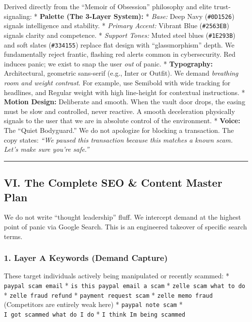 \documentclass[
]{article}
\begin{document}
Derived directly from the ``Memoir of Obsession'' philosophy and elite
trust-signaling: * \textbf{Palette (The 3-Layer System):} * \emph{Base:}
Deep Navy (\texttt{\#0D1526}) signals intelligence and stability. *
\emph{Primary Accent:} Vibrant Blue (\texttt{\#2563EB}) signals clarity
and competence. * \emph{Support Tones:} Muted steel blues
(\texttt{\#1E293B}) and soft slates (\texttt{\#334155}) replace flat
design with ``glassmorphism'' depth. We fundamentally reject frantic,
flashing red alerts common in cybersecurity. Red induces panic; we exist
to snap the user \emph{out} of panic. * \textbf{Typography:}
Architectural, geometric sans-serif (e.g., Inter or Outfit). We demand
\emph{breathing room and weight contrast}. For example, use Semibold
with wide tracking for headlines, and Regular weight with high
line-height for contextual instructions. * \textbf{Motion Design:}
Deliberate and smooth. When the vault door drops, the easing must be
slow and controlled, never reactive. A smooth deceleration physically
signals to the user that we are in absolute control of the environment.
* \textbf{Voice:} The ``Quiet Bodyguard.'' We do not apologize for
blocking a transaction. The copy states: \emph{``We paused this
transaction because this matches a known scam. Let's make sure you're
safe.''}

\begin{center}\rule{0.5\linewidth}{0.5pt}\end{center}

\subsection{VI. The Complete SEO \& Content Master
Plan}\label{vi.-the-complete-seo-content-master-plan}

We do not write ``thought leadership'' fluff. We intercept demand at the
highest point of panic via Google Search. This is an engineered takeover
of specific search terms.

\subsubsection{1. Layer A Keywords (Demand
Capture)}\label{layer-a-keywords-demand-capture}

These target individuals actively being manipulated or recently scammed:
* \texttt{paypal\ scam\ email} *
\texttt{is\ this\ paypal\ email\ a\ scam} *
\texttt{zelle\ scam\ what\ to\ do} * \texttt{zelle\ fraud\ refund} *
\texttt{payment\ request\ scam} * \texttt{zelle\ memo\ fraud}
(Competitors are entirely weak here) * \texttt{paypal\ note\ scam} *
\texttt{I\ got\ scammed\ what\ do\ I\ do} *
\texttt{I\ think\ I\textquotesingle{}m\ being\ scammed}
\end{document}
